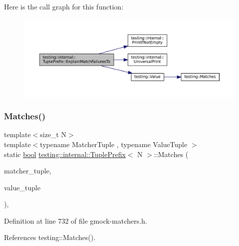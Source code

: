 Here is the call graph for this function\+:
\nopagebreak
\begin{figure}[H]
\begin{center}
\leavevmode
\includegraphics[width=350pt]{classtesting_1_1internal_1_1TuplePrefix_a0ffd38ce90ae6da645a5655aefac5bb7_cgraph}
\end{center}
\end{figure}
\mbox{\label{classtesting_1_1internal_1_1TuplePrefix_ada24ceee73c02e3bb7f8264143170f7a}} 
\subsubsection{\texorpdfstring{Matches()}{Matches()}}
{\footnotesize\ttfamily template$<$size\+\_\+t N$>$ \\
template$<$typename Matcher\+Tuple , typename Value\+Tuple $>$ \\
static \hyperlink{classbool}{bool} \hyperlink{classtesting_1_1internal_1_1TuplePrefix}{testing\+::internal\+::\+Tuple\+Prefix}$<$ N $>$\+::Matches (\begin{DoxyParamCaption}\item[{const \hyperlink{structtesting_1_1internal_1_1MatcherTuple}{Matcher\+Tuple} \&}]{matcher\+\_\+tuple,  }\item[{const Value\+Tuple \&}]{value\+\_\+tuple }\end{DoxyParamCaption})\hspace{0.3cm}{\ttfamily [inline]}, {\ttfamily [static]}}



Definition at line 732 of file gmock-\/matchers.\+h.



References testing\+::\+Matches().


